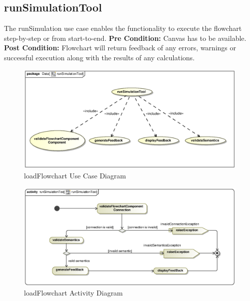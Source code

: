 \documentclass[11pt,a4paper,titlepage]{article}
\begin{document}
\newpage
\subsection{runSimulationTool}
The runSimulation use case enables the functionality to execute the flowchart step-by-step or from start-to-end.\newline\newline
\textbf{Pre Condition:} Canvas has to be available.\newline\newline
\textbf{Post Condition:} Flowchart will return feedback of any errors, warnings or successful execution along with the results of any calculations.

\begin{figure}[H]
  \centering
\includegraphics[width=500px]{runSimulationToolUseCase.eps}
\caption{loadFlowchart Use Case Diagram}
\end{figure}

\begin{figure}[H]
  \centering
\includegraphics[width=500px]{runSimulationToolActivity.eps}
\caption{loadFlowchart Activity Diagram}
\end{figure}

\newpage
\end{document}
